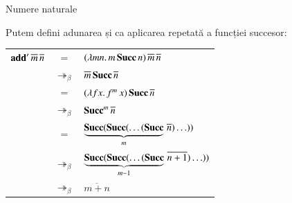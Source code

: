 \documentclass[xcolor=pdftex,romanian,colorlinks]{beamer}
\begin{document}
\begin{frame}{Numere naturale}

\begin{center}
\end{center}

\vspace{-.2cm}
Putem defini \alert{adunarea} și ca aplicarea repetată a funcției succesor:
\vspace{-.2cm}
\begin{center}
\end{center}

\vspace{-.2cm}
\begin{center}
\begin{tabular}{rcl}
$\mathbf{add}'\, \overline{m}\, \overline{n}$ & $=$ & $(\lambda mn.\,m\, \mathbf{Succ}\, n)\, \overline{m}\, \overline{n}$  \\
& $\twoheadrightarrow_\beta$ & $\overline{m}\, \mathbf{Succ}\, \overline{n}$ \\
& $=$ & $(\lambda fx.\,f^m\, x)\, \mathbf{Succ}\, \overline{n}$ \\
& $\twoheadrightarrow_\beta$ & $\mathbf{Succ}^m\, \overline{n}$ \\
& $=$ & $\underbrace{\mathbf{Succ}(\mathbf{Succ}(\ldots(\mathbf{Succ}}_{m}\,\overline{n})\ldots))$ \\
& $\twoheadrightarrow_\beta$ & $\underbrace{\mathbf{Succ}(\mathbf{Succ}(\ldots(\mathbf{Succ}}_{m-1}\,\overline{n+1})\ldots))$ \\
& $\twoheadrightarrow_\beta$ & $\overline{m+n}$
\end{tabular}
\end{center}

\end{frame}
\end{document}
